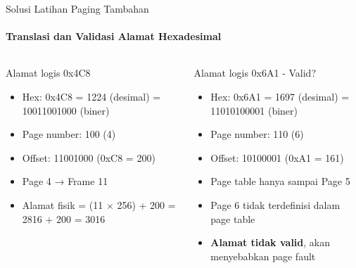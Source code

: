 \documentclass[10pt,aspectratio=169]{beamer}
\begin{document}
\begin{frame}{Solusi Latihan Paging Tambahan}
    \framesubtitle{Translasi dan Validasi Alamat Hexadesimal}
    
    \begin{columns}[T]
            \begin{block}{Alamat logis 0x4C8}
                \begin{itemize}
                    \item Hex: 0x4C8 = 1224 (desimal) = 10011001000 (biner)
                    \item Page number: 100 (4)
                    \item Offset: 11001000 (0xC8 = 200)
                    \item Page 4 → Frame 11
                    \item Alamat fisik = (11 $\times$ 256) + 200 = 2816 + 200 = 3016
                \end{itemize}
            \end{block}
            
            \begin{alertblock}{Alamat logis 0x6A1 - Valid?}
                \begin{itemize}
                    \item Hex: 0x6A1 = 1697 (desimal) = 11010100001 (biner)
                    \item Page number: 110 (6)
                    \item Offset: 10100001 (0xA1 = 161)
                    \item Page table hanya sampai Page 5
                    \item Page 6 tidak terdefinisi dalam page table
                    \item \textbf{Alamat tidak valid}, akan menyebabkan page fault
                \end{itemize}
            \end{alertblock}
    \end{columns}
\end{frame}
\end{document}
